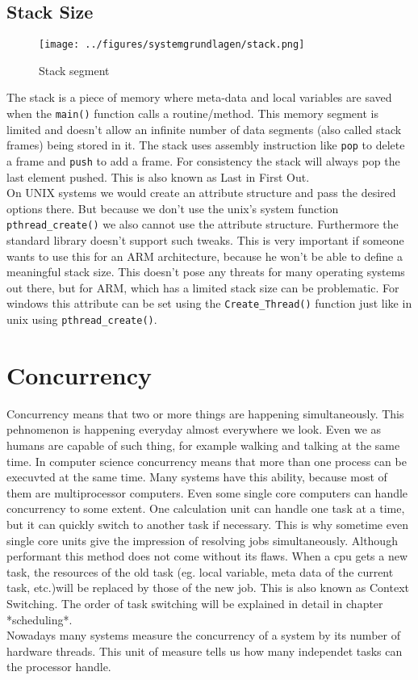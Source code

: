\subsection{Stack Size}
\begin{wrapfigure}{1}{0.5\textwidth}
	\centering
	\texttt{[image: ../figures/systemgrundlagen/stack.png]}
	\caption{Stack segment}
	\cite{stack}
\end{wrapfigure}
The stack is a piece of memory where meta-data and local variables are saved when the \texttt{main()} function calls a routine/method. This memory segment is limited and doesn't allow an infinite number of data segments (also called stack frames) being stored in it. The stack uses assembly instruction like \texttt{pop} to delete a frame and \texttt{push} to add a frame. For consistency the stack will always pop the last element pushed. This is also known as \dq Last in First Out\dq{}\cite{stack}.\\
On UNIX systems we would create an attribute structure and pass the
desired options there. But because we don't use the unix's system function \texttt{pthread\_create()} we also
cannot use the attribute structure. Furthermore the standard library doesn't support such tweaks. 
This is very important if someone wants to use this for an ARM architecture, because he won't be
able to define a meaningful stack size. This doesn't pose any threats for many operating systems out
there, but for ARM, which has a limited stack size can be problematic. For windows this attribute
can be set using the \texttt{Create\_Thread()} function just like in unix using \texttt{pthread\_create()}.
\newpage
\section{Concurrency}
\label{ssec:concurrency}
Concurrency means that two or more things are happening simultaneously. This pehnomenon is happening
everyday almost everywhere we look. Even we as humans are capable of such thing, for example walking
and talking at the same time. In computer science concurrency means that more than one process can
be execuvted at the same time. Many systems have this ability, because most of them are
multiprocessor computers. Even some single core computers can handle concurrency to some extent.
One calculation unit can handle one task at a time, but it can quickly switch to another task if
necessary. This is why sometime even single core units give the impression of resolving jobs
simultaneously\cite[Chapter~1]{concurrency}. Although performant this method does not come without its flaws. When a cpu gets a new task, the resources of the old task (eg. local variable, meta data of the current task, etc.)will be replaced by those of the new job. This is also known as \dq Context Switching\dq{}.
The order of task switching will be explained in detail in chapter *scheduling*.\\ 
Nowadays many systems measure the concurrency of a system by its number of hardware threads. This
unit of measure tells us how many independet tasks can the processor handle.

